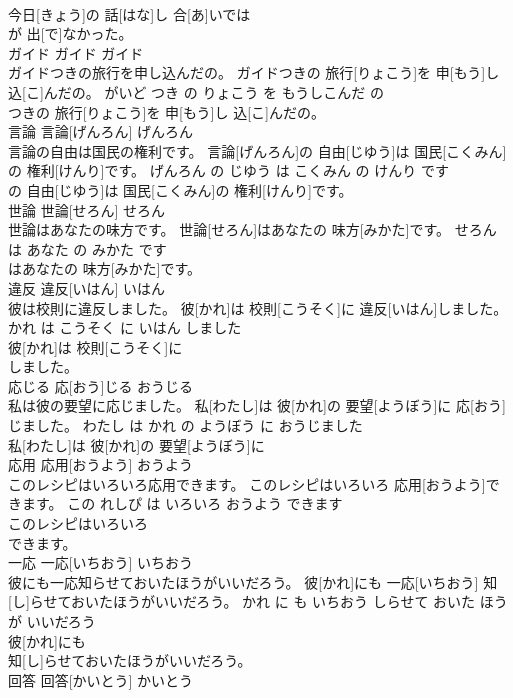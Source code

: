 \documentclass[8pt]{extreport}
\begin{document}
\begin{CJK}{UTF8}{min}
\\	今日[きょう]の 話[はな]し 合[あ]いでは
\\	が 出[で]なかった。			
\\	ガイド	ガイド	ガイド	
\\	ガイドつきの旅行を申し込んだの。	ガイドつきの 旅行[りょこう]を 申[もう]し 込[こ]んだの。	がいど つき の りょこう を もうしこんだ の	
\\	つきの 旅行[りょこう]を 申[もう]し 込[こ]んだの。			
\\	言論	言論[げんろん]	げんろん	
\\	言論の自由は国民の権利です。	言論[げんろん]の 自由[じゆう]は 国民[こくみん]の 権利[けんり]です。	げんろん の じゆう は こくみん の けんり です	
\\	の 自由[じゆう]は 国民[こくみん]の 権利[けんり]です。			
\\	世論	世論[せろん]	せろん	
\\	世論はあなたの味方です。	世論[せろん]はあなたの 味方[みかた]です。	せろん は あなた の みかた です	
\\	はあなたの 味方[みかた]です。			
\\	違反	違反[いはん]	いはん	
\\	彼は校則に違反しました。	彼[かれ]は 校則[こうそく]に 違反[いはん]しました。	かれ は こうそく に いはん しました	
\\	彼[かれ]は 校則[こうそく]に
\\	しました。			
\\	応じる	応[おう]じる	おうじる	
\\	私は彼の要望に応じました。	私[わたし]は 彼[かれ]の 要望[ようぼう]に 応[おう]じました。	わたし は かれ の ようぼう に おうじました	
\\	私[わたし]は 彼[かれ]の 要望[ようぼう]に
\\	応用	応用[おうよう]	おうよう	
\\	このレシピはいろいろ応用できます。	このレシピはいろいろ 応用[おうよう]できます。	この れしぴ は いろいろ おうよう できます	
\\	このレシピはいろいろ
\\	できます。			
\\	一応	一応[いちおう]	いちおう	
\\	彼にも一応知らせておいたほうがいいだろう。	彼[かれ]にも 一応[いちおう] 知[し]らせておいたほうがいいだろう。	かれ に も いちおう しらせて おいた ほう が いいだろう	
\\	彼[かれ]にも
\\	知[し]らせておいたほうがいいだろう。			
\\	回答	回答[かいとう]	かいとう	

\end{CJK}
\end{document}
